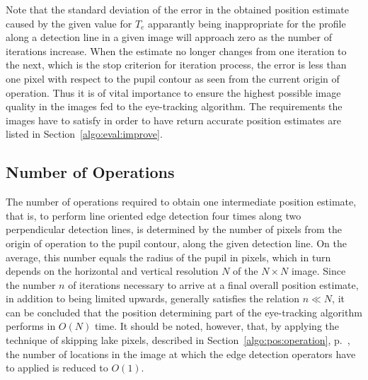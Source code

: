 Note that the standard deviation of the error in the obtained position
estimate caused by the given value for $T_{e}$ apparantly being
inappropriate for the profile along a detection line in a given image
will approach zero as the number of iterations increase.  When the
estimate no longer changes from one iteration to the next, which is
the stop criterion for iteration process, the error is less than one
pixel with respect to the pupil contour as seen from the current
origin of operation.  Thus it is of vital importance to ensure the
highest possible image quality in the images fed to the {\octopus}
eye-tracking algorithm.  The requirements the images have to satisfy
in order to have {\octopus} return accurate position estimates are
listed in Section~\ref{algo:eval:improve}.

\subsection{Number of Operations}
\label{algo:pos:O}

The number of operations required to obtain one intermediate position
estimate, that is, to perform line oriented edge detection four times
along two perpendicular detection lines, is determined by the number
of pixels from the origin of operation to the pupil contour, along the
given detection line.  On the average, this number equals the radius
of the pupil in pixels, which in turn depends on the horizontal and
vertical resolution $N$ of the $N\times N$ image.  Since the number
$n$ of iterations necessary to arrive at a final overall position
estimate, in addition to being limited upwards, generally satisfies
the relation $n\ll N$, it can be concluded that the position
determining part of the {\octopus} eye-tracking algorithm performs in
$O(N)$ time.  It should be noted, however, that, by applying the
technique of skipping lake pixels, described in
Section~\ref{algo:pos:operation}, p.~\pageref{pg:skiplakepixels}, the
number of locations in the image at which the edge detection operators
have to applied is reduced to $O(1)$.
